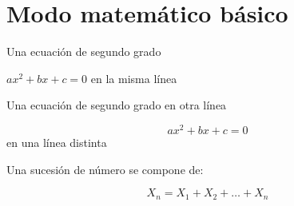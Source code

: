 \documentclass[10pt,a4paper]{article}
\begin{document}
\section{Modo matemático básico}

Una ecuación de segundo grado

$ax^2+bx+c=0$ en la misma línea

Una ecuación de segundo grado en otra línea

$$ax^2+bx+c=0$$ en una línea distinta

Una sucesión de número se compone de:

$$X_n = X_1 + X_2 + \ldots + X_n $$
\end{document}
